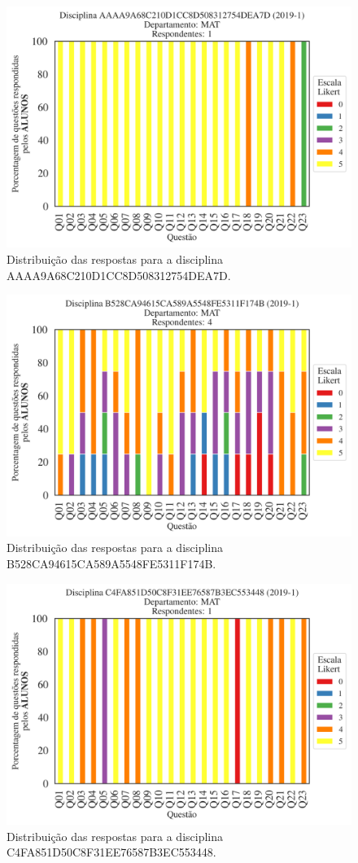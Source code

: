 \documentclass[a4paper,10pt]{article}
\begin{document}
\begin{figure}[h]
\centering
\includegraphics[width=0.485\linewidth]{analise_disciplina_departamento_MAT_ALUNO_TURMA_AAAA9A68C210D1CC8D508312754DEA7D.png}
\caption{\label{fig:analise_geral_departamento}                Distribuição das respostas para a disciplina AAAA9A68C210D1CC8D508312754DEA7D.}
\end{figure}
\begin{figure}[h]
\centering
\includegraphics[width=0.485\linewidth]{analise_disciplina_departamento_MAT_ALUNO_TURMA_B528CA94615CA589A5548FE5311F174B.png}
\caption{\label{fig:analise_geral_departamento}                Distribuição das respostas para a disciplina B528CA94615CA589A5548FE5311F174B.}
\end{figure}
\begin{figure}[h]
\centering
\includegraphics[width=0.485\linewidth]{analise_disciplina_departamento_MAT_ALUNO_TURMA_C4FA851D50C8F31EE76587B3EC553448.png}
\caption{\label{fig:analise_geral_departamento}                Distribuição das respostas para a disciplina C4FA851D50C8F31EE76587B3EC553448.}
\end{figure}
\end{document}

